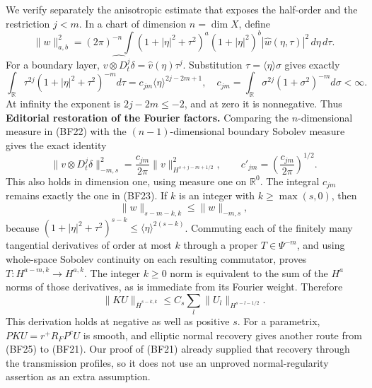 \documentclass[
  11pt,
]{article}
\makeatletter
\let\ReaderOriginalAnchorStart\hyper@anchorstart
\let\ReaderOriginalAnchorEnd\hyper@anchorend
\let\ReaderPendingAliases\@empty
\def\ReaderArmAliases#1{\gdef\ReaderPendingAliases{#1}}
\def\hyper@anchorstart#1{\ReaderIfNativeAnchorTF{#1}{\ReaderPendingAliases\global\let\ReaderPendingAliases\@empty}{}\ReaderOriginalAnchorStart{#1}}
\makeatother
\begin{document}
We verify separately the anisotropic estimate that exposes the
half-order and the restriction \(j<m\). In a chart of dimension
\(n=\dim X\), define \[
 \|w\|_{a,b}^2=(2\pi)^{-n}\int
 (1+|\eta|^2+\tau^2)^a(1+|\eta|^2)^b
                    |\widehat w(\eta,\tau)|^2\,d\eta\,d\tau.
 \tag{BF22}
\] For a boundary layer,
\(\widehat{v\otimes D_t^j\delta}=\widehat v(\eta)\tau^j\). Substitution
\(\tau=\langle\eta\rangle\sigma\) gives exactly \[
 \int_{\mathbb R}\tau^{2j}(1+|\eta|^2+\tau^2)^{-m}d\tau
 =c_{jm}\langle\eta\rangle^{2j-2m+1},\quad
 c_{jm}=\int_{\mathbb R}\sigma^{2j}(1+\sigma^2)^{-m}d\sigma<\infty.
 \tag{BF23}
\] At infinity the exponent is \(2j-2m\leq-2\), and at zero it is
nonnegative. Thus \textbf{Editorial restoration of the Fourier factors.}
Comparing the \(n\)-dimensional measure in (BF22) with the
\((n-1)\)-dimensional boundary Sobolev measure gives the exact identity
\[
 \|v\otimes D_t^j\delta\|_{-m,s}^2
 =\frac{c_{jm}}{2\pi}\|v\|_{H^{s+j-m+1/2}}^2,
 \qquad c'_{jm}=\left(\frac{c_{jm}}{2\pi}\right)^{1/2}.
 \tag{BF23a}
\] This also holds in dimension one, using measure one on
\(\mathbb R^0\). The integral \(c_{jm}\) remains exactly the one in
(BF23). If \(k\) is an integer with \(k\geq\max(s,0)\), then \[
 \|w\|_{s-m-k,k}\leq\|w\|_{-m,s},
 \tag{BF24}
\] because \((1+|\eta|^2+\tau^2)^{s-k}\leq\langle\eta\rangle^{2(s-k)}\).
Commuting each of the finitely many tangential derivatives of order at
most \(k\) through a proper \(T\in\Psi^{-m}\), and using whole-space
Sobolev continuity on each resulting commutator, proves
\(T:H^{a-m,k}\to H^{a,k}\). The integer \(k\geq0\) norm is equivalent to
the sum of the \(H^a\) norms of those derivatives, as is immediate from
its Fourier weight. Therefore \[
 \|KU\|_{\bar H^{s-k,k}}\leq C_s
                 \sum_l\|U_l\|_{H^{s-l-1/2}}.
 \tag{BF25}
\] This derivation holds at negative as well as positive \(s\). For a
parametrix, \(PKU=r^+R_FP^cU\) is smooth, and elliptic normal recovery
gives another route from (BF25) to (BF21). Our proof of (BF21) already
supplied that recovery through the transmission profiles, so it does not
use an unproved normal-regularity assertion as an extra assumption.

\ReaderArmAliases{\ReaderOriginalAnchorStart{AN03-GFB-008}\ReaderOriginalAnchorEnd\begingroup\expandafter\def\csname @currentHref\endcsname{AN03-GFB-008}\label{AN03-GFB-008}\endgroup\ReaderOriginalAnchorStart{an03-gfb-008-an-explicit-inverse-and-its-left-error}\ReaderOriginalAnchorEnd\begingroup\expandafter\def\csname @currentHref\endcsname{an03-gfb-008-an-explicit-inverse-and-its-left-error}\label{an03-gfb-008-an-explicit-inverse-and-its-left-error}\endgroup\ReaderOriginalAnchorStart{8-an-explicit-inverse-and-its-left-error}\ReaderOriginalAnchorEnd\begingroup\expandafter\def\csname @currentHref\endcsname{8-an-explicit-inverse-and-its-left-error}\label{8-an-explicit-inverse-and-its-left-error}\endgroup\ReaderOriginalAnchorStart{an-explicit-inverse-and-its-left-error}\ReaderOriginalAnchorEnd}
\end{document}

